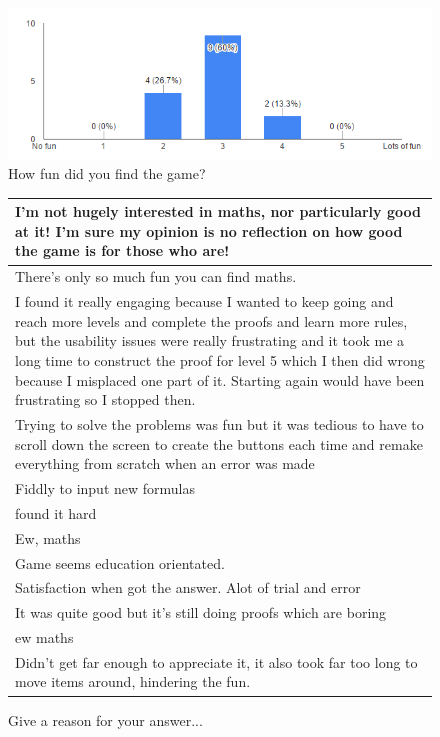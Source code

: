 \begin{figure}[H]
\includegraphics[scale=0.8]{fun}
\caption{How fun did you find the game?}
\end{figure}

\begin{figure}[H]
\begin{tabular}{|p{12cm}|} 
\hline
I'm not hugely interested in maths, nor particularly good at it! I'm sure my opinion is no reflection on how good the game is for those who are! \\
\hline
There's only so much fun you can find maths. \\
\hline
I found it really engaging because I wanted to keep going and reach more levels and complete the proofs and learn more rules, but the usability issues were really frustrating and it took me a long time to construct the proof for level 5 which I then did wrong because I misplaced one part of it. Starting again would have been frustrating so I stopped then. \\
\hline
Trying to solve the problems was fun but it was tedious to have to scroll down the screen to create the buttons each time and remake everything from scratch when an error was made \\
\hline
Fiddly to input new formulas \\
\hline
found it hard \\
\hline
Ew, maths \\
\hline
Game seems education orientated. \\
\hline
Satisfaction when got the answer. Alot of trial and error \\
\hline
It was quite good but it's still doing proofs which are boring \\
\hline
ew maths \\
\hline
Didn't get far enough to appreciate it, it also took far too long to move items around, hindering the fun. \\
\hline
\end{tabular}
\caption{Give a reason for your answer...}
\end{figure}

